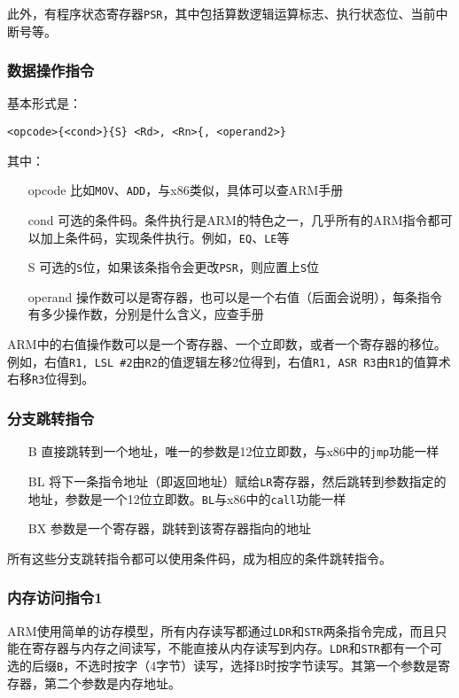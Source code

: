 此外，有程序状态寄存器\lstinline!PSR!，其中包括算数逻辑运算标志、执行状态位、当前中断号等。

\subsubsection{数据操作指令}
基本形式是：
\begin{lstlisting}[numbers=none]
<opcode>{<cond>}{S} <Rd>, <Rn>{, <operand2>}
\end{lstlisting}
其中：
\begin{itemize}
\item[opcode] 比如\lstinline!MOV!、\lstinline!ADD!，与x86类似，具体可以查ARM手册
\item[cond] 可选的条件码。条件执行是ARM的特色之一，几乎所有的ARM指令都可以加上条件码，实现条件执行。例如，\lstinline!EQ!、\lstinline!LE!等
\item[S] 可选的\lstinline!S!位，如果该条指令会更改\lstinline!PSR!，则应置上\lstinline!S!位
\item[operand] 操作数可以是寄存器，也可以是一个右值（后面会说明），每条指令有多少操作数，分别是什么含义，应查手册
\end{itemize}

ARM中的右值操作数可以是一个寄存器、一个立即数，或者一个寄存器的移位。例如，右值\lstinline!R1, LSL #2!由\lstinline!R2!的值逻辑左移2位得到，右值\lstinline!R1, ASR R3!由\lstinline!R1!的值算术右移\lstinline!R3!位得到。

\subsubsection{分支跳转指令}
\begin{itemize}
\item[B] 直接跳转到一个地址，唯一的参数是12位立即数，与x86中的\lstinline!jmp!功能一样
\item[BL] 将下一条指令地址（即返回地址）赋给\lstinline!LR!寄存器，然后跳转到参数指定的地址，参数是一个12位立即数。\lstinline!BL!与x86中的\lstinline!call!功能一样
\item[BX] 参数是一个寄存器，跳转到该寄存器指向的地址
\end{itemize}
所有这些分支跳转指令都可以使用条件码，成为相应的条件跳转指令。

\subsubsection{内存访问指令1}
ARM使用简单的访存模型，所有内存读写都通过\lstinline!LDR!和\lstinline!STR!两条指令完成，而且只能在寄存器与内存之间读写，不能直接从内存读写到内存。\lstinline!LDR!和\lstinline!STR!都有一个可选的后缀\lstinline!B!，不选时按字（4字节）读写，选择B时按字节读写。其第一个参数是寄存器，第二个参数是内存地址。

